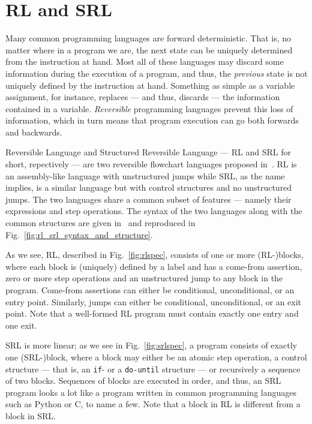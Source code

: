 
\section{RL and SRL}\label{sec:rlandsrl}

Many common programming languages are forward deterministic. That is, no matter where in a program we are, the next state can be uniquely determined from the instruction at hand. Most all of these languages may discard some information during the execution of a program, and thus, the \textit{previous} state is not uniquely defined by the instruction at hand. Something as simple as a variable assignment, for instance, replaces --- and thus, discards --- the information contained in a variable. \textit{Reversible} programming languages prevent this loss of information, which in turn means that program execution can go both forwards and backwards.

Reversible Language and Structured Reversible Language --- RL and SRL for short, repectively --- are two reversible flowchart languages proposed in~\cite{REV}. RL is an assembly-like language with unstructured jumps while SRL, as the name implies, is a similar language but with control structures and no unstructured jumps. The two languages share a common subset of features --- namely their expressions and step operations. The syntax of the two languages along with the common structures are given in~\cite[Fig.~12]{REV} and reproduced in Fig.~\ref{fig:rl_srl_syntax_and_structure}.

As we see, RL, described in Fig.~\ref{fig:rlspec}, consists of one or more (RL-)blocks, where each block is (uniquely) defined by a label and has a come-from assertion, zero or more step operations and an unstructured jump to any block in the program. Come-from assertions can either be conditional, unconditional, or an entry point. Similarly, jumps can either be conditional, unconditional, or an exit point. Note that a well-formed RL program must contain exactly one entry and one exit.

SRL is more linear; as we see in Fig.~\ref{fig:srlspec}, a program consists of exactly one (SRL-)block, where a block may either be an atomic step operation, a control structure --- that is, an \texttt{if}- or a \texttt{do-until} structure --- or recursively a sequence of two blocks. Sequences of blocks are executed in order, and thus, an SRL program looks a lot like a program written in common programming languages such as Python or C, to name a few. Note that a block in RL is different from a block in SRL.

